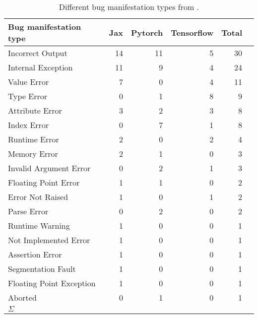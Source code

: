 \documentclass[sigconf,screen]{acmart}
\begin{document}


\begin{table}
  \small
  \centering
  \caption{\label{table:bug-stats}Different bug manifestation types
    from \tname.}
  \vspace{-1ex}
  \begin{tabular}{lrrrrr}\toprule
    Bug manifestation type &Jax &Pytorch &Tensorflow &Total \\\midrule
    Incorrect Output &14 &11 &5 &30 \\
    Internal Exception &11 &9 &4 &24 \\
    Value Error &7 &0 &4 &11 \\
    Type Error &0 &1 &8 &9 \\
    Attribute Error &3 &2 &3 &8 \\
    Index Error &0 &7 &1 &8 \\
    Runtime Error &2 &0 &2 &4 \\
    Memory Error &2 &1 &0 &3 \\
    Invalid Argument Error &0 &2 &1 &3 \\
    Floating Point Error &1 &1 &0 &2 \\
    Error Not Raised &1 &0 &1 &2 \\
    Parse Error &0 &2 &0 &2 \\
    Runtime Warning &1 &0 &0 &1 \\
    Not Implemented Error &1 &0 &0 &1 \\
    Assertion Error &1 &0 &0 &1 \\
    Segmentation Fault &1 &0 &0 &1 \\
    Floating Point Exception &1 &0 &0 &1 \\
    Aborted &0 &1 &0 &1 \\
    \midrule
    $\Sigma$ &\numjaxbugs{} &\numtorchbugs{} &\numtfbugs{} &\numbugs{} \\
    \bottomrule
  \end{tabular}
  \vspace{-2ex}  
\end{table}
\end{document}
